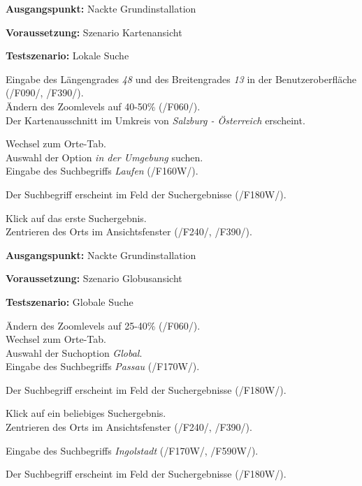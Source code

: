 \documentclass[10pt]{scrreprt}
\newcommand{\sfbf}[1]{\textbf{\sffamily #1}}
\newcommand{\ziel}[1]{{\fontsize{9.5}{11}\textsf{/#1/}}}
\newcommand{\ziellabel}{Z}
\newcommand{\wunsch}{\renewcommand{\labelenumi}{\textbf{\ziel{\ziellabel\numprint{\theenumi}0W}}}}
\newenvironment{details}[1][6pt]{%
  \parskip#1 \parindent6mm \raggedright%
  \def\item{\par\ignorespaces\hangindent=5mm \hangafter1}}{%
  \par\ignorespaces}
\begin{document}
\vspace{1.0cm}
\begin{details}[2pt]
\item \sfbf{Ausgangspunkt:} Nackte Grundinstallation 
\item \sfbf{Voraussetzung:} Szenario Kartenansicht
\item \sfbf{Testszenario:} Lokale Suche
\end{details}
\vspace{2mm}
\begin{enumerate}[leftmargin = 2.2cm, resume]
\item Eingabe des Längengrades \textit{48} und des Breitengrades \textit{13} in der Benutzeroberfläche (\ziel{F090}, \ziel{F390}).\\Ändern des Zoomlevels auf 40-50\% (\ziel{F060}).\\Der Kartenausschnitt im Umkreis von \textit{Salzburg - Österreich} erscheint.
\wunsch
\item Wechsel zum Orte-Tab.\\Auswahl der Option \textit{in der Umgebung} suchen.\\Eingabe des Suchbegriffs \textit{Laufen} (\ziel{F160W}).
\item Der Suchbegriff erscheint im Feld der Suchergebnisse (\ziel{F180W}).
\item Klick auf das erste Suchergebnis.\\Zentrieren des Orts im Ansichtsfenster (\ziel{F240}, \ziel{F390}).
\end{enumerate}


\vspace{1.0cm}
\begin{details}[2pt]
\item \sfbf{Ausgangspunkt:} Nackte Grundinstallation 
\item \sfbf{Voraussetzung:} Szenario Globusansicht
\item \sfbf{Testszenario:} Globale Suche
\end{details}
\vspace{2mm}
\begin{enumerate}[leftmargin = 2.2cm, resume]
\wunsch
\item Ändern des Zoomlevels auf 25-40\% (\ziel{F060}).\\Wechsel zum Orte-Tab.\\Auswahl der Suchoption \textit{Global}.\\Eingabe des Suchbegriffs \textit{Passau} (\ziel{F170W}).
\item Der Suchbegriff erscheint im Feld der Suchergebnisse (\ziel{F180W}).
\item Klick auf ein beliebiges Suchergebnis.\\Zentrieren des Orts im Ansichtsfenster (\ziel{F240}, \ziel{F390}).
\item Eingabe des Suchbegriffs \textit{Ingolstadt} (\ziel{F170W}, \ziel{F590W}).
\item Der Suchbegriff erscheint im Feld der Suchergebnisse (\ziel{F180W}).
\end{enumerate}
\end{document}
